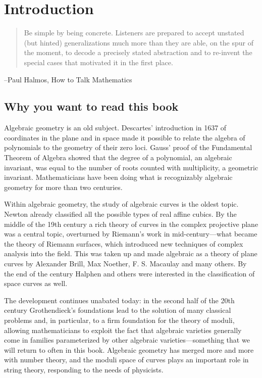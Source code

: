 

\setlength{\parskip}{5pt}

\addtocounter{chapter}{-1}
\chapter{Introduction}
\label{IntroChapter}

\begin{quote}
Be simple by being concrete. Listeners are prepared to
accept unstated (but hinted) generalizations much more than they are able, on the spur of the moment, to
decode a precisely stated abstraction and to re-invent the special cases that motivated it in the first place. 
\end{quote}

--Paul Halmos, How to Talk Mathematics
\section{Why you want to read this book}

Algebraic geometry is an old subject. Descartes' introduction in 1637 of coordinates in the plane and in space made it possible to relate the algebra of polynomials to the geometry of their zero loci. Gauss' proof of the Fundamental Theorem of Algebra showed that the degree of a polynomial, an algebraic invariant, was equal to the number of roots counted with multiplicity, a geometric invariant. Mathematicians have been doing what is recognizably algebraic geometry for more than two centuries.

Within algebraic geometry, the study of algebraic curves is the oldest topic. Newton already classified all the possible types of real affine cubics. By the middle of
the 19th century a rich theory of curves in the complex projective plane was a central topic, overturned by Riemann's work in mid-century---what became the theory of Riemann surfaces, which introduced new techniques of complex analysis into the field. This was  taken up and made algebraic as a theory of plane curves by Alexander Brill, Max Noether, F. S. Macaulay and many others. By the end of the century Halphen and others were interested in the classification of space curves as well. 

The development continues unabated today: in the second half of the 20th century Grothendieck's foundations lead to the solution of many classical problems and, in particular, to a firm foundation for the theory of moduli, allowing mathematicians to exploit the fact that algebraic varieties generally come in families parameterized by other algebraic varieties---something that we will return to often in this book. Algebraic geometry has merged more and more with number theory, and the moduli space of curves plays an important role in string theory, responding to the needs of physicists.

